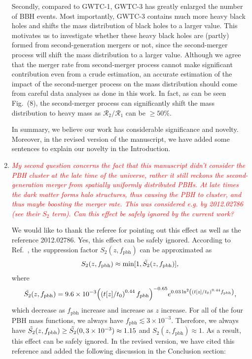 \documentclass[
preprint,          %
superscriptaddress,%
amsmath,           %
amssymb,           %
aps,               %
prl,               %
notitlepage,       %
longbibliography,  %
floatfix,          %
nofootinbib,
onecolumn,
]{revtex4-1}
\newcommand{\red}[1]{\textcolor{red}{#1}}
\newcommand{\cR}{\mathcal{R}}
\begin{document}
\begin{enumerate}
Secondly, compared to GWTC-1, GWTC-3 has greatly enlarged the number of BBH events. Most importantly, GWTC-3 contains much more heavy black holes and shifts the mass distribution of black holes to a larger value. This motivates us to investigate whether these heavy black holes are (partly) formed from second-generation mergers or not, since the second-merger process will shift the mass distribution to a larger value. Although we agree that the merger rate from second-merger process cannot make significant contribution even from a crude estimation, an accurate estimation of the impact of the second-merger process on the mass distribution should come from careful data analyses as done in this work. In fact, as can be seen Fig.~(8), the second-merger process can significantly shift the mass distribution to heavy mass as $\cR_2/\cR_1$ can be $\geq 50\%$.

In summary, we believe our work has considerable signiﬁcance and novelty. Moreover, in the revised version of the manuscript, we have added some sentences to explain our novelty in the Introduction.

\item \red{\it My second question concerns the fact that this manuscript didn't consider the PBH cluster at the late time of the universe, rather it still reckons the second-generation merger from spatially uniformly distributed PBHs. At late times the dark matter forms halo structures, thus causing the PBH to cluster, and thus maybe boosting the merger rate. This was considered e.g. by 2012.02786 (see their $S_2$ term). Can this effect be safely ignored by the current work?}

We would like to thank the referee for pointing out this effect as well as the reference 2012.02786. Yes, this effect can be safely ignored. According to Ref.~\cite{Hutsi:2020sol}, the suppression factor $S_2(z,f_{\mathrm{pbh}})$ can be approximated as 
\begin{equation}
    S_2(z,f_{\mathrm{pbh}}) \approx \mathrm{min}[1,\Tilde{S_2}(z,f_{\mathrm{pbh}})], 
\end{equation}
where 
\begin{equation}
\Tilde{S_2}(z,f_{\mathrm{pbh}})=9.6 \times 10^{-3} {\left(\left(t[z]/t_0\right)^{0.44}f_{\mathrm{pbh}}\right)}^{-0.65} e^{0.03 \ln ^2 \left(\left(t[z]/t_0\right)^{0.44}f_{\mathrm{pbh}}\right)},
\end{equation}
which decrease as $f_{\mathrm{pbh}}$ increase and increase as $z$ increase. For all of the four PBH mass functions, we always have $f_{\mathrm{pbh}} \lesssim 3\times10^{-3}$. Therefore, we always have $\Tilde{S_2}(z,f_{\mathrm{pbh}})\geq \Tilde{S_2}(0,3\times 10^{-3}) \approx 1.15$ and $S_2(z,f_{\mathrm{pbh}})\approx 1$. As a result, this effect can be safely ignored.  In the revised version, we have cited this reference and added the following discussion in the Conclusion section:


\end{enumerate}
\end{document}
